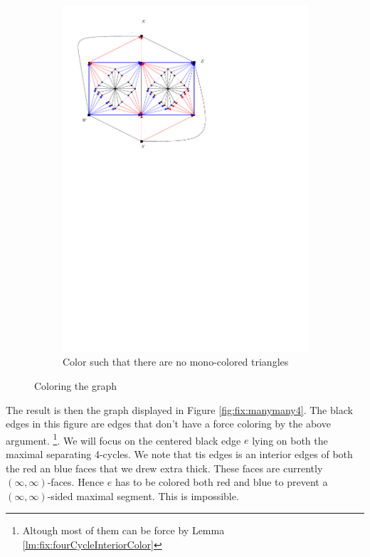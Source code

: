 \begin{figure}[h]
\begin{subfigure}[t]{0.3\textwidth}
      \includegraphics[width=\textwidth]{fixExtension/img/manymany3}
      \caption{Color such that there are no mono-colored triangles}
      \label{fig:fix:manymany3}
    \end{subfigure}
    \caption{Coloring the graph}
    \label{fig:fix:coloring}
  \end{figure}

  The result is then the graph displayed in Figure \ref{fig:fix:manymany4}. The black edges in this figure are edges that don't have a force coloring by the above argument.
  \footnote{Altough most of them can be force by Lemma \ref{lm:fix:fourCycleInteriorColor}}.
  We will focus on the centered black edge $e$ lying on both the maximal separating 4-cycles. We note that tis edges is an interior edges of both the red an blue faces that we drew extra thick. These faces are currently $(\infty, \infty)$-faces. Hence $e$ has to be colored both red and blue to prevent a $(\infty, \infty)$-sided maximal segment. This is impossible.



